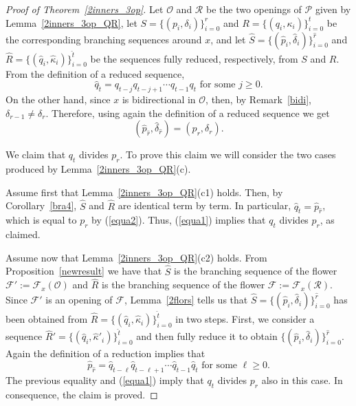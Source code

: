 \documentclass[a4paper]{amsart}
\theoremstyle{definition}
\begin{document}
\begin{proof}[Proof of Theorem~\ref{2inners_3op}]
Let $\mathcal{O}$ and $\mathcal{R}$ be the two openings of $\mathcal{P}$ given by Lemma~\ref{2inners_3op_QR}, let $S=\{(p_i,\delta_i)\}_{i=0}^r$ and $R=\{(q_i,\kappa_i)\}_{i=0}^t$ be the corresponding branching sequences around $x$, and let $\widehat{S}=\{(\widehat{p}_i,\widehat{\delta}_i)\}_{i=0}^{\widehat{r}}$ and $\widehat{R}=\{(\widehat{q}_i,\widehat{\kappa}_i)\}_{i=0}^{\widehat{t}}$ be the sequences fully reduced, respectively, from $S$ and $R$.
From the definition of a reduced sequence,
\begin{equation}\label{equa1}
\widehat{q}_{\widehat{t}}=q_{t-j}q_{t-j+1}\cdots q_{t-1}q_{t}\mbox{ for some }j\ge0.
\end{equation}
On the other hand, since $x$ is bidirectional in $\mathcal{O}$, then, by Remark~\ref{bidi}, $\delta_{r-1}\neq\delta_r$. Therefore, using again the definition of a reduced sequence we get
\begin{equation}\label{equa2}
(\widehat{p}_{\widehat{r}},\widehat{\delta}_{\widehat{r}})=(p_r,\delta_r).
\end{equation}

We claim that $q_t$ divides $p_r$. To prove this claim we will consider the two cases produced by Lemma~\ref{2inners_3op_QR}(c).

Assume first that Lemma~\ref{2inners_3op_QR}(c1) holds. Then, by Corollary~\ref{bra4}, $\widehat{S}$ and $\widehat{R}$ are identical term by term. In particular, $\widehat{q}_{\widehat{t}}=\widehat{p}_{\widehat{r}}$, which is equal to $p_r$ by (\ref{equa2}). Thus, (\ref{equa1}) implies that $q_t$ divides $p_r$, as claimed.

Assume now that Lemma~\ref{2inners_3op_QR}(c2) holds. From Proposition~\ref{newresult} we have that $\widehat{S}$ is the branching sequence of the flower $\mathcal{F}':=\mathcal{F}_x(\mathcal{O})$ and $\widehat{R}$ is the branching sequence of the flower $\mathcal{F}:=\mathcal{F}_x(\mathcal{R})$. Since $\mathcal{F}'$ is an opening of $\mathcal{F}$, Lemma~\ref{2flors} tells us that $\widehat{S}=\{(\widehat{p}_i,\widehat{\delta}_i)\}_{i=0}^{\widehat{r}}$ has been obtained from $\widehat{R}=\{(\widehat{q}_i,\widehat{\kappa}_i)\}_{i=0}^{\widehat{t}}$ in two steps. First, we consider a sequence $\widehat{R}'=\{(\widehat{q}_i,\widehat{\kappa}'_i)\}_{i=0}^{\widehat{t}}$ and then fully reduce it to obtain $\{(\widehat{p}_i,\widehat{\delta}_i)\}_{i=0}^{\widehat{r}}$. Again the definition of a reduction implies that
\[ \widehat{p}_{\widehat{r}}=\widehat{q}_{\widehat{t}-\ell}\widehat{q}_{\widehat{t}-\ell+1}\cdots\widehat{q}_{\widehat{t}-1}\widehat{q}_{\widehat{t}}\mbox{ for some }\ell\ge0. \]
The previous equality and (\ref{equa1}) imply that $q_t$ divides $p_r$ also in this case. In consequence, the claim is proved.


\end{proof}
\end{document}
